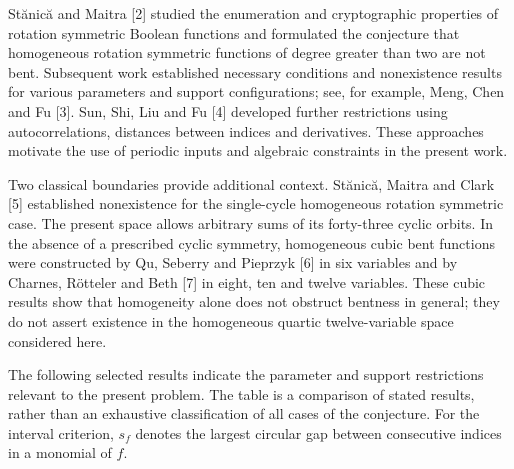 \documentclass[11pt,a4paper]{article}
\begin{document}
St\u{a}nic\u{a} and Maitra [2] studied the enumeration and cryptographic properties of rotation symmetric Boolean functions and formulated the conjecture that homogeneous rotation symmetric functions of degree greater than two are not bent. Subsequent work established necessary conditions and nonexistence results for various parameters and support configurations; see, for example, Meng, Chen and Fu [3]. Sun, Shi, Liu and Fu [4] developed further restrictions using autocorrelations, distances between indices and derivatives. These approaches motivate the use of periodic inputs and algebraic constraints in the present work.

Two classical boundaries provide additional context. St\u{a}nic\u{a}, Maitra and Clark [5] established nonexistence for the single-cycle homogeneous rotation symmetric case. The present space allows arbitrary sums of its forty-three cyclic orbits. In the absence of a prescribed cyclic symmetry, homogeneous cubic bent functions were constructed by Qu, Seberry and Pieprzyk [6] in six variables and by Charnes, Rötteler and Beth [7] in eight, ten and twelve variables. These cubic results show that homogeneity alone does not obstruct bentness in general; they do not assert existence in the homogeneous quartic twelve-variable space considered here.

The following selected results indicate the parameter and support restrictions relevant to the present problem. The table is a comparison of stated results, rather than an exhaustive classification of all cases of the conjecture. For the interval criterion, $s_f$ denotes the largest circular gap between consecutive indices in a monomial of $f$.
\end{document}
